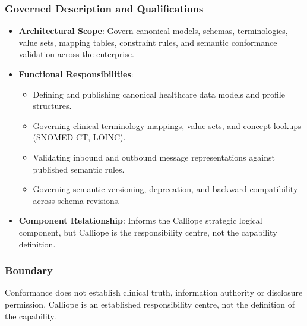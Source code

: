 \subsubsection*{Governed Description and Qualifications}

\begin{itemize}

\item
\textbf{Architectural Scope}: Govern canonical models, schemas, terminologies, value sets, mapping tables, constraint rules, and semantic conformance validation across the enterprise.



\item
\textbf{Functional Responsibilities}:


\begin{itemize}

\item
Defining and publishing canonical healthcare data models and profile structures.



\item
Governing clinical terminology mappings, value sets, and concept lookups (SNOMED CT, LOINC).



\item
Validating inbound and outbound message representations against published semantic rules.



\item
Governing semantic versioning, deprecation, and backward compatibility across schema revisions.



\end{itemize}


\item
\textbf{Component Relationship}: Informs the Calliope strategic logical component, but Calliope is the responsibility centre, not the capability definition.



\end{itemize}
\subsubsection*{Boundary}

Conformance does not establish clinical truth, information authority or disclosure permission. Calliope is an established responsibility centre, not the definition of the capability.


